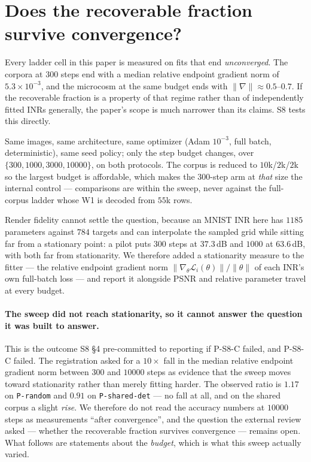 \documentclass[10pt,letterpaper]{article}
\theoremstyle{definition}
\begin{document}
\section{Does the recoverable fraction survive convergence?}\label{sec:convergence}

Every ladder cell in this paper is measured on fits that end \emph{unconverged}. The corpora at
$300$ steps end with a median relative endpoint gradient norm of $5.3\times10^{-3}$, and the
microcosm at the same budget ends with $\|\nabla\|\approx0.5$--$0.7$. If the recoverable fraction is
a property of that regime rather than of independently fitted INRs generally, the paper's scope is
much narrower than its claims. S8 tests this directly.

Same images, same architecture, same optimizer (Adam $10^{-3}$, full batch, deterministic), same
seed policy; only the step budget changes, over $\{300, 1000, 3000, 10000\}$, on both protocols. The
corpus is reduced to $10$k/$2$k/$2$k so the largest budget is affordable, which makes the
$300$-step arm at \emph{that} size the internal control --- comparisons are within the sweep, never
against the full-corpus ladder whose W1 is decoded from $55$k rows.

Render fidelity cannot settle the question, because an MNIST INR here has $1185$ parameters against
$784$ targets and can interpolate the sampled grid while sitting far from a stationary point: a
pilot puts $300$ steps at $37.3$\,dB and $1000$ at $63.6$\,dB, with both far from stationarity. We
therefore added a stationarity measure to the fitter --- the relative endpoint gradient norm
$\|\nabla_\theta \mathcal L_i(\theta)\|/\|\theta\|$ of each INR's own full-batch loss --- and report
it alongside PSNR and relative parameter travel at every budget.



\paragraph{The sweep did not reach stationarity, so it cannot answer the question it was built to
answer.} This is the outcome S8 §4 pre-committed to reporting if P-S8-C failed, and P-S8-C failed.
The registration asked for a $10\times$ fall in the median relative endpoint gradient norm between
$300$ and $10000$ steps as evidence that the sweep moves toward stationarity rather than merely
fitting harder. The observed ratio is $1.17$ on \texttt{P-random} and $0.91$ on
\texttt{P-shared-det} --- no fall at all, and on the shared corpus a slight \emph{rise}. We
therefore do not read the accuracy numbers at $10000$ steps as measurements ``after convergence'',
and the question the external review asked --- whether the recoverable fraction survives
convergence --- remains open. What follows are statements about the \emph{budget}, which is what
this sweep actually varied.
\end{document}
